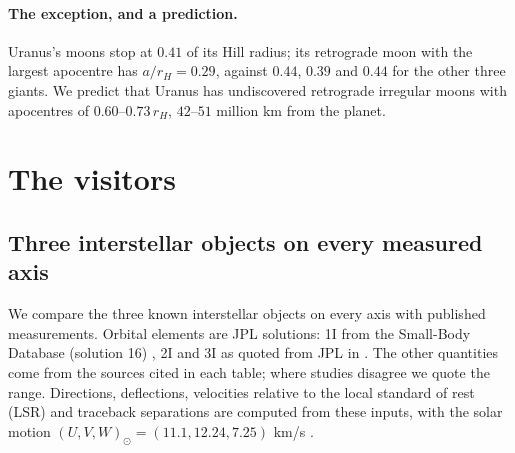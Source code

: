 \documentclass[11pt]{article}
\theoremstyle{definition}\newtheorem{definition}[theorem]{Definition}
\theoremstyle{remark}\newtheorem{remark}[theorem]{Remark}
\begin{document}
\paragraph{The exception, and a prediction.} Uranus's moons stop at $0.41$ of its Hill radius; its retrograde moon with the largest apocentre has $a/r_H=0.29$, against $0.44$, $0.39$ and $0.44$ for the other three giants. We predict that Uranus has undiscovered retrograde irregular moons with apocentres of $0.60$--$0.73\,r_H$, $42$--$51$ million km from the planet.

\section{The visitors}\label{sec:visitors}
\subsection{Three interstellar objects on every measured axis}\label{sec:iso}
We compare the three known interstellar objects on every axis with published measurements. Orbital elements are JPL solutions: 1I from the Small-Body Database (solution 16) \cite{JPL1I}, 2I and 3I as quoted from JPL in \cite{W2I,W3I}. The other quantities come from the sources cited in each table; where studies disagree we quote the range. Directions, deflections, velocities relative to the local standard of rest (LSR) and traceback separations are computed from these inputs, with the solar motion $(U,V,W)_\odot=(11.1,12.24,7.25)$ km/s \cite{SBD10}.
\end{document}

